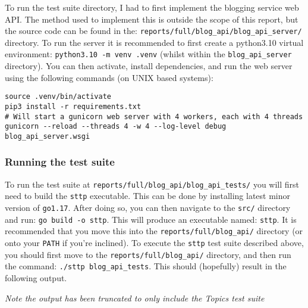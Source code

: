 To run the test suite directory, I had to first implement the blogging service web API. The method used to implement this is outside the scope of this report, but the source code can be found in the: \verb|reports/full/blog_api/blog_api_server/| directory. To run the server it is recommended to first create a python3.10 virtual environment: \texttt{python3.10 -m venv .venv} (whilst within the \verb|blog_api_server| directory). You can then activate, install dependencies, and run the web server using the following commands (on UNIX based systems):

\begin{center}
    \begin{verbatim}
source .venv/bin/activate
pip3 install -r requirements.txt
# Will start a gunicorn web server with 4 workers, each with 4 threads
gunicorn --reload --threads 4 -w 4 --log-level debug blog_api_server.wsgi
    \end{verbatim}
\end{center}

\subsubsection{Running the test suite}

To run the test suite at \verb|reports/full/blog_api/blog_api_tests/| you will first need to build the \verb|sttp| executable. This can be done by installing latest minor version of \verb|go1.17|. After doing so, you can then navigate to the \verb|src/| directory and run: \verb|go build -o sttp|. This will produce an executable named: \verb|sttp|. It is recommended that you move this into the \verb|reports/full/blog_api/| directory (or onto your \verb|PATH| if you're inclined). To execute the \verb|sttp| test suite described above, you should first move to the \verb|reports/full/blog_api/| directory, and then run the command: \verb|./sttp blog_api_tests|. This should (hopefully) result in the following output.

\begin{center}
    \textit{Note the output has been truncated to only include the Topics test suite}
\end{center}

